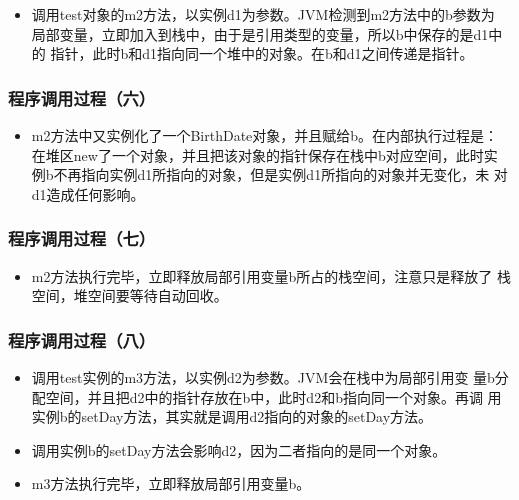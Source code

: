 \begin{itemize}
\item 调用test对象的m2方法，以实例d1为参数。JVM检测到m2方法中的b参数为
  局部变量，立即加入到栈中，由于是引用类型的变量，所以b中保存的是d1中的
  指针，此时b和d1指向同一个堆中的对象。在b和d1之间传递是指针。
\end{itemize}

\subsubsection{程序调用过程（六）}

\begin{itemize}
\item m2方法中又实例化了一个BirthDate对象，并且赋给b。在内部执行过程是：
  在堆区new了一个对象，并且把该对象的指针保存在栈中b对应空间，此时实
  例b不再指向实例d1所指向的对象，但是实例d1所指向的对象并无变化，未
  对d1造成任何影响。
\end{itemize}

\subsubsection{程序调用过程（七）}

\begin{itemize}
\item m2方法执行完毕，立即释放局部引用变量b所占的栈空间，注意只是释放了
  栈空间，堆空间要等待自动回收。
\end{itemize}

\subsubsection{程序调用过程（八）}

\begin{itemize}
\item 调用test实例的m3方法，以实例d2为参数。JVM会在栈中为局部引用变
  量b分配空间，并且把d2中的指针存放在b中，此时d2和b指向同一个对象。再调
  用实例b的setDay方法，其实就是调用d2指向的对象的setDay方法。
\item 调用实例b的setDay方法会影响d2，因为二者指向的是同一个对象。
\item m3方法执行完毕，立即释放局部引用变量b。
\end{itemize}

